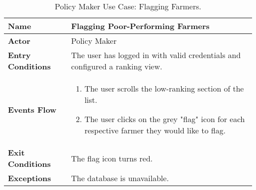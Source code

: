 
\begin{table}
\centering
\small
\caption{\label{tab:policyUseFlag}Policy Maker Use Case: Flagging Farmers.}
\renewcommand{\arraystretch}{1.25}
\begin{tabular}{|l|>{\raggedright\arraybackslash}m{12cm}|}
    \hline
    \textbf{Name} & Flagging Poor-Performing Farmers\\
    \hline
   	\textbf{Actor} & Policy Maker\\
    \hline
    \textbf{Entry Conditions} & The user has logged in with valid credentials and configured a ranking view.\\
    \hline
    \textbf{Events Flow} & 
    \begin{enumerate}
    	\item The user scrolls the low-ranking section of the list.
    	\item The user clicks on the grey "flag" icon for each respective farmer they would like to flag. 
    \end{enumerate}\\
    \hline
    \textbf{Exit Conditions} & The flag icon turns red.\\
    \hline
    \textbf{Exceptions} & The database is unavailable.\\
    \hline
\end{tabular}
\end{table}